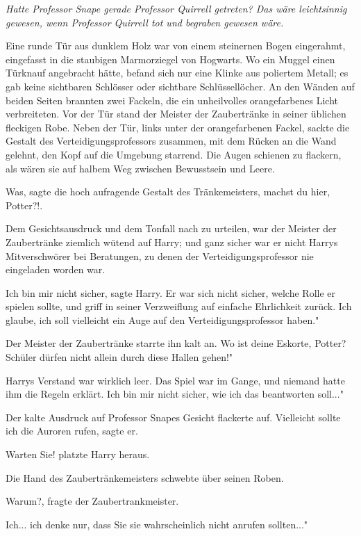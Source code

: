 \emph{Hatte Professor Snape gerade Professor Quirrell getreten? Das wäre
leichtsinnig gewesen, wenn Professor Quirrell tot und begraben gewesen wäre.}

Eine runde Tür aus dunklem Holz war von einem steinernen Bogen eingerahmt,
eingefasst in die staubigen Marmorziegel von Hogwarts. Wo ein Muggel einen
Türknauf angebracht hätte, befand sich nur eine Klinke aus poliertem Metall; es
gab keine sichtbaren Schlösser oder sichtbare Schlüssellöcher. An den Wänden auf
beiden Seiten brannten zwei Fackeln, die ein unheilvolles orangefarbenes Licht
verbreiteten. Vor der Tür stand der Meister der Zaubertränke in seiner üblichen
fleckigen Robe. Neben der Tür, links unter der orangefarbenen Fackel, sackte die
Gestalt des Verteidigungsprofessors zusammen, mit dem Rücken an die Wand
gelehnt, den Kopf auf die Umgebung starrend. Die Augen schienen zu flackern, als
wären sie auf halbem Weg zwischen Bewusstsein und Leere.

\glqq Was\grqq{}, sagte die hoch aufragende Gestalt des Tränkemeisters, \glqq
machst du hier, Potter?!\grqq{}.

Dem Gesichtsausdruck und dem Tonfall nach zu urteilen, war der Meister der
Zaubertränke ziemlich wütend auf Harry; und ganz sicher war er nicht Harrys
Mitverschwörer bei Beratungen, zu denen der Verteidigungsprofessor nie
eingeladen worden war.

\glqq Ich bin mir nicht sicher\grqq{}, sagte Harry. Er war sich nicht sicher,
welche Rolle er spielen sollte, und griff in seiner Verzweiflung auf einfache
Ehrlichkeit zurück. \glqq Ich glaube, ich soll vielleicht ein Auge auf den
Verteidigungsprofessor haben."

Der Meister der Zaubertränke starrte ihn kalt an. \glqq Wo ist deine Eskorte,
Potter? Schüler dürfen nicht allein durch diese Hallen gehen!"

Harrys Verstand war wirklich leer. Das Spiel war im Gange, und niemand hatte ihm
die Regeln erklärt. \glqq Ich bin mir nicht sicher, wie ich das beantworten
soll..."

Der kalte Ausdruck auf Professor Snapes Gesicht flackerte auf. \glqq Vielleicht
sollte ich die Auroren rufen\grqq{}, sagte er.

\glqq Warten Sie!\grqq{} platzte Harry heraus.

Die Hand des Zaubertränkemeisters schwebte über seinen Roben.

\glqq Warum?\grqq{}, fragte der Zaubertrankmeister.

\glqq Ich... ich denke nur, dass Sie sie wahrscheinlich nicht anrufen
sollten..."


